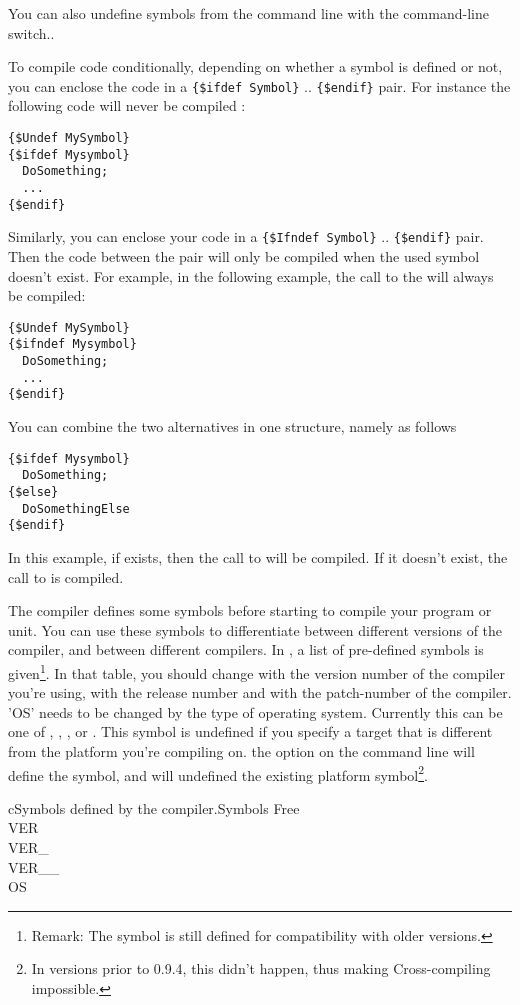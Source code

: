 \documentclass{report}
\begin{document}
You can also undefine symbols from the command line with the 
command-line switch..

To compile code conditionally, depending on whether a symbol is defined or
not, you can enclose the code in a \verb|{$ifdef Symbol}| .. \verb|{$endif}|
pair. For instance the following code will never be compiled :
\begin{verbatim}
{$Undef MySymbol}
{$ifdef Mysymbol}
  DoSomething;
  ...
{$endif}
\end{verbatim}

Similarly, you can enclose your code in a \verb|{$Ifndef Symbol}| .. \verb|{$endif}|
pair. Then the code between the pair will only be compiled when the used
symbol doesn't exist. For example, in the following example, the call to the
 will always be compiled:
\begin{verbatim}
{$Undef MySymbol}
{$ifndef Mysymbol}
  DoSomething;
  ...
{$endif}
\end{verbatim}

You can combine the two alternatives in one structure, namely as follows
\begin{verbatim}
{$ifdef Mysymbol}
  DoSomething;
{$else}
  DoSomethingElse
{$endif}
\end{verbatim}
In this example, if  exists, then the call to 
will be compiled. If it doesn't exist, the call to  is
compiled.

The \fpc compiler defines some symbols before starting to compile your
program or unit. You can use these symbols to differentiate between
different versions of the compiler, and between different compilers.
In , a list of pre-defined symbols is given\footnote{Remark:
The  symbol is still defined for compatibility with older versions.}. In that table,
you should change  with the version number of the compiler
you're using,  with the release number and 
with the patch-number of the compiler. 'OS' needs to be changed by the type
of operating system. Currently this can be one of , ,
,  or . This symbol is undefined if you
specify a target that is different from the platform you're compiling on.
the  option on the command line will define the  symbol,
and will undefined the existing platform symbol\footnote{In versions prior to
0.9.4, this didn't happen, thus making Cross-compiling impossible.}.

\begin{FPCltable}{c}{Symbols defined by the compiler.}{Symbols} \hline
Free \\
VER \\
VER\_ \\
VER\_\_ \\
OS \\ \hline
\end{FPCltable}
\end{document}
